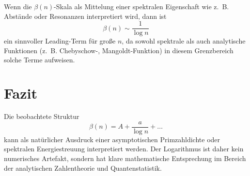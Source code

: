 \documentclass[a4paper,12pt]{article}
\begin{document}
Wenn die \(\beta(n)\)-Skala als Mittelung einer spektralen Eigenschaft wie z.~B. Abstände oder Resonanzen interpretiert wird, dann ist
\[
\beta(n) \sim \frac{1}{\log n}
\]
ein sinnvoller Leading-Term für große \(n\), da sowohl spektrale als auch analytische Funktionen (z.~B. Chebyschow-, Mangoldt-Funktion) in diesem Grenzbereich solche Terme aufweisen.

\section*{Fazit}

Die beobachtete Struktur
\[
\beta(n) = A + \frac{a}{\log n} + \dots
\]
kann als natürlicher Ausdruck einer asymptotischen Primzahldichte oder spektralen Energiestreuung interpretiert werden. Der Logarithmus ist daher kein numerisches Artefakt, sondern hat klare mathematische Entsprechung im Bereich der analytischen Zahlentheorie und Quantenstatistik.
\end{document}
